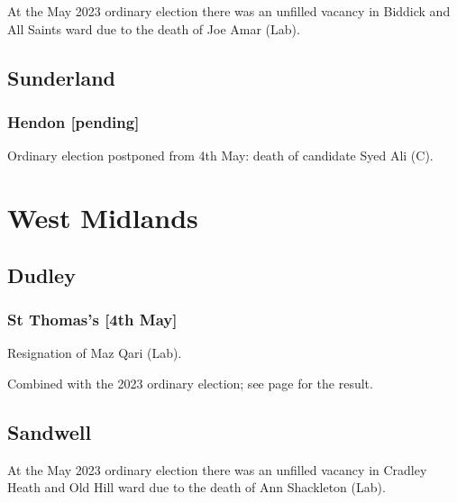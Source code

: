 \documentclass[a4paper,openany]{book}
\begin{document}
\begin{resultsiii}
At the May 2023 ordinary election there was an unfilled vacancy in Biddick and All Saints ward due to the death of Joe Amar (Lab).%

\subsection*{Sunderland}

\subsubsection*{Hendon \hspace*{\fill}\nolinebreak[1]%
	\enspace\hspace*{\fill}
	[pending]}


Ordinary election postponed from 4th May: death of candidate Syed Ali (C).

\section{West Midlands}

\subsection*{Dudley}

\subsubsection*{St Thomas's \hspace*{\fill}\nolinebreak[1]%
	\enspace\hspace*{\fill}
	[4th May]}


Resignation of Maz Qari (Lab).

Combined with the 2023 ordinary election; see page \pageref{DudleySaintThomass} for the result.

\subsection*{Sandwell}

At the May 2023 ordinary election there was an unfilled vacancy in Cradley Heath and Old Hill ward due to the death of Ann Shackleton (Lab).%


\end{resultsiii}
\end{document}
